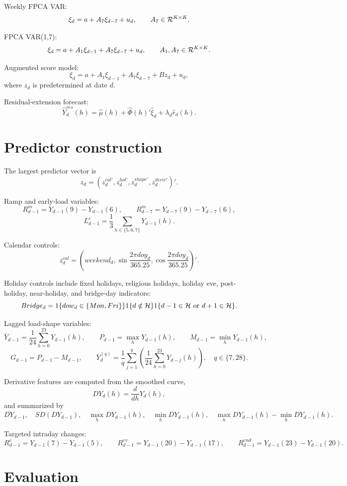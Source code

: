 \documentclass[10pt,a4paper]{article}
\begin{document}
Weekly FPCA VAR:
\[
\xi_d=a+A_7\xi_{d-7}+u_d,
\qquad A_7\in{\cal R}^{K\times K}.
\]

FPCA VAR(1,7):
\[
\xi_d=a+A_1\xi_{d-1}+A_7\xi_{d-7}+u_d,
\qquad A_1,A_7\in{\cal R}^{K\times K}.
\]

Augmented score model:
\[
\xi_d=a+A_1\xi_{d-1}+A_7\xi_{d-7}+Bz_d+u_d,
\]
where \(z_d\) is predetermined at date \(d\).

Residual-extension forecast:
\[
\widehat Y_d^{res}(h)
=
\widehat\mu(h)+\widehat{\Phi}(h)'\widehat\xi_d+\lambda_d\widehat r_d(h).
\]

\section*{Predictor construction}

The largest predictor vector is
\[
z_d=
\left(
z_d^{cal'},z_d^{hol'},z_d^{shape'},z_d^{deriv'}
\right)'.
\]

Ramp and early-load variables:
\[
R^m_{d-1}=Y_{d-1}(9)-Y_{d-1}(6),
\qquad
R^m_{d-7}=Y_{d-7}(9)-Y_{d-7}(6),
\]
\[
L^e_{d-1}=\frac{1}{3}\sum_{h\in\{5,6,7\}}Y_{d-1}(h).
\]

Calendar controls:
\[
z_d^{cal}
=
\left(
weekend_d,
\sin\frac{2\pi doy_d}{365.25},
\cos\frac{2\pi doy_d}{365.25}
\right)'.
\]

Holiday controls include fixed holidays, religious holidays, holiday eve, post-holiday, near-holiday, and bridge-day indicators:
\[
Bridge_d=
1\{dow_d\in\{Mon,Fri\}\}
1\{d\notin{\cal H}\}
1\{d-1\in{\cal H}\ {\rm or}\ d+1\in{\cal H}\}.
\]

Lagged load-shape variables:
\[
\bar Y_{d-1}=\frac{1}{24}\sum_{h=0}^{23}Y_{d-1}(h),
\qquad
P_{d-1}=\max_hY_{d-1}(h),
\qquad
M_{d-1}=\min_hY_{d-1}(h),
\]
\[
G_{d-1}=P_{d-1}-M_{d-1},
\qquad
\bar Y_d^{(q)}
=
\frac{1}{q}\sum_{j=1}^{q}
\left(
\frac{1}{24}\sum_{h=0}^{23}Y_{d-j}(h)
\right),
\quad q\in\{7,28\}.
\]

Derivative features are computed from the smoothed curve,
\[
DY_d(h)=\frac{d}{dh}Y_d(h),
\]
and summarized by
\[
\overline{DY}_{d-1},\quad
SD(DY_{d-1}),\quad
\max_hDY_{d-1}(h),\quad
\min_hDY_{d-1}(h),\quad
\max_hDY_{d-1}(h)-\min_hDY_{d-1}(h).
\]

Targeted intraday changes:
\[
R^e_{d-1}=Y_{d-1}(7)-Y_{d-1}(5),
\qquad
R^{ev}_{d-1}=Y_{d-1}(20)-Y_{d-1}(17),
\qquad
R^{end}_{d-1}=Y_{d-1}(23)-Y_{d-1}(20).
\]

\section*{Evaluation}
\end{document}
